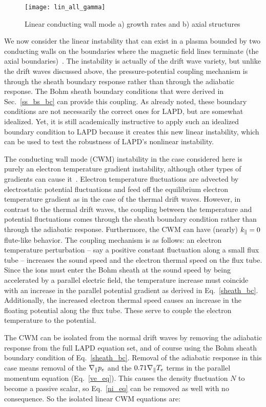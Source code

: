 \begin{figure}[!htbp]
\texttt{[image: lin\_all\_gamma]}
\hfil
\caption{Linear conducting wall mode a) growth rates and b) axial structures}
\label{lin_all_gamma}
\end{figure}


We now consider the linear instability that can exist in a plasma bounded by two conducting walls on the boundaries where the magnetic field lines terminate
(the axial boundaries)~\cite{berk1991,berk1993,xu1993}.
The instability is actually of the drift wave variety, but unlike the drift waves discussed above, the pressure-potential coupling mechanism is through the sheath boundary response
rather than through the adiabatic response. The Bohm sheath boundary conditions that were derived in Sec.~\ref{ss_bs_bc} can provide this coupling. 
As already noted, these boundary conditions are not necessarily the correct ones
for LAPD, but are somewhat idealized. Yet, it is still academically instructive to apply such an idealized boundary condition to LAPD because it creates this new linear instability, which
can be used to test the robustness of LAPD's nonlinear instability.

The conducting wall mode (CWM) instability in the case considered here is purely an electron temperature gradient instability, although other types of gradients can cause it~\cite{berk1993}.
Electron temperature fluctuations are advected by electrostatic potential fluctuations and feed off the equilibrium electron temperature gradient as in the case of the thermal drift waves.
However, in contrast to the thermal drift waves, the coupling between the temperature and potential fluctuations comes through the sheath boundary condition rather than through the adiabatic
response. Furthermore, the CWM can have (nearly) $k_\parallel = 0$ flute-like behavior. The coupling mechanism is as follows: an electron temperature perturbation -- say a
positive constant fluctuation along a small flux tube -- increases the sound speed and the electron thermal speed on the flux tube. 
Since the ions must enter the Bohm sheath at the sound speed by being accelerated
by a parallel electric field, the temperature increase must coincide with an increase in the parallel potential gradient as derived in Eq.~\ref{sheath_bc}. Additionally, the increased
electron thermal speed causes an increase in the floating potential along the flux tube. These serve to couple the electron temperature to the potential.

The CWM can be isolated from the normal drift waves by removing the adiabatic response from the full LAPD equation set, and of course using the Bohm sheath boundary condition of Eq.~\ref{sheath_bc}.
Removal of the adiabatic response in this case means removal of the $\nabla_\parallel p_e$ and the $0.71 \nabla_\parallel T_e$ terms in the parallel momentum equation (Eq.~\ref{ve_eq}). This causes the 
density fluctuation $N$ to become a passive scalar, so Eq.~\ref{ni_eq} can be removed as well with no consequence. So the isolated linear CWM equations are:

